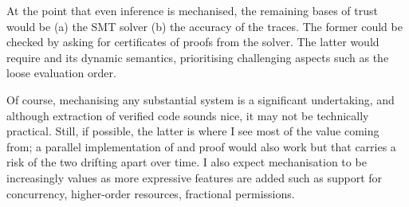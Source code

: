 At the point that even inference is mechanised, the remaining bases of trust
would be (a) the SMT solver (b) the accuracy of the traces. The former could be
checked  by asking for certificates of proofs from the solver. The latter would require  and
its dynamic semantics, prioritising challenging aspects such as the loose
evaluation order.

Of course, mechanising any substantial system is a significant undertaking, and
although extraction of verified code sounds nice, it may not be technically
practical. Still, if possible, the latter is where I see most of the value
coming from; a parallel implementation of and proof would also work but that
carries a risk of the two drifting apart over time. I also expect mechanisation
to be increasingly values as more expressive features are added such as support
for concurrency, higher-order resources, fractional permissions.
